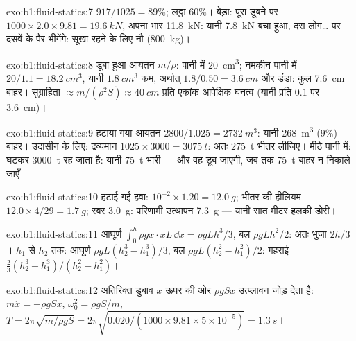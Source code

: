 \begin{solution}{exo:b1:fluid-statics:7}
$917/1025 = 89\%$; लट्ठा $60\%$। बेड़ा: पूरा डूबने पर  $1000 \times
2.0 \times 9.81 = \qty{19.6}{kN}$, अपना भार \qty{11.8}{kN}: यानी \qty{7.8}{kN}
बचा हुआ, दस लोग\dots{} पर दसवें के पैर भीगेंगे: सूखा रहने के लिए नौ
(\qty{800}{kg})।
\end{solution}

\begin{solution}{exo:b1:fluid-statics:8}
डूबा हुआ आयतन $m/\rho$: पानी में \qty{20}{cm^3}; नमकीन पानी में $20/1.1 = \qty{18.2}{cm^3}$,
यानी $\qty{1.8}{cm^3}$ कम, अर्थात् $1.8/0.50 = \qty{3.6}{cm}$ और डंडा: कुल
\qty{7.6}{cm} बाहर। सुग्राहिता $\approx m/(\rho^2S) \approx \qty{40}{cm}$ प्रति
एकांक आपेक्षिक घनत्व (यानी प्रति $0.1$ पर \qty{3.6}{cm})।
\end{solution}

\begin{solution}{exo:b1:fluid-statics:9}
हटाया गया आयतन $2800/1.025 = \qty{2732}{m^3}$: यानी \qty{268}{m^3} ($9\%$)
बाहर। उदासीन के लिए: द्रव्यमान $1025 \times 3000 = \qty{3075}{t}$: अतः
\qty{275}{t} भीतर लीजिए। मीठे पानी में:  घटकर \qty{3000}{t} रह
जाता है: यानी \qty{75}{t} भारी --- और वह डूब जाएगी, जब तक \qty{75}{t} बाहर न
निकाले जाएँ।
\end{solution}

\begin{solution}{exo:b1:fluid-statics:10}
हटाई गई हवा: $10^{-2} \times 1.20 = \qty{12.0}{g}$; भीतर की हीलियम $12.0 \times
4/29 = \qty{1.7}{g}$; रबर \qty{3.0}{g}: परिणामी उत्थापन \qty{7.3}{g} --- यानी
सात मीटर हलकी डोरी।
\end{solution}

\begin{solution}{exo:b1:fluid-statics:11}
आघूर्ण $\int_0^h\rho gx\cdot xL\,\dd x = \rho gLh^3/3$, बल $\rho gLh^2/2$:
अतः भुजा $2h/3$। $h_1$ से $h_2$ तक: आघूर्ण $\rho gL(h_2^3 - h_1^3)/3$, बल
$\rho gL(h_2^2 - h_1^2)/2$: गहराई $\frac23(h_2^3 - h_1^3)/(h_2^2 - h_1^2)$।
\end{solution}

\begin{solution}{exo:b1:fluid-statics:12}
अतिरिक्त डुबाव $x$ ऊपर की ओर $\rho gSx$ उत्प्लावन जोड़ देता है: $m\ddot x = -\rho gSx$,
$\omega_0^2 = \rho gS/m$, $T = 2\pi\sqrt{m/\rho gS} = 2\pi\sqrt{0.020/(1000 \times
9.81 \times 5\times10^{-5})} = \qty{1.3}{s}$।
\end{solution}

